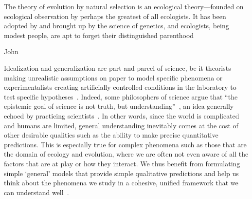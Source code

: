 \epigraph{\justifying The theory of evolution by natural selection is an ecological theory—founded on ecological observation by perhaps the greatest of all ecologists. It has been adopted by and brought up by the science of genetics, and ecologists, being modest people, are apt to forget their distinguished parenthood}{John~\citet{harper_darwinian_1967}}

%
Idealization and generalization are part and parcel of science, be it theorists making unrealistic assumptions on paper to model specific phenomena or experimentalists creating artificially controlled conditions in the laboratory to test specific hypotheses~\citep{zuk_models_2018}. Indeed, some philosophers of science argue that ``the epistemic goal of science is not truth, but understanding''~\citep{potochnik_idealization_2018}, an idea generally echoed by practicing scientists~\citep{levins_strategy_1966,servedio_not_2014,zuk_models_2018,grainger_empiricists_2022}. In other words, since the world is complicated and humans are limited, general understanding inevitably comes at the cost of other desirable qualities such as the ability to make precise quantitative predictions. This is especially true for complex phenomena such as those that are the domain of ecology and evolution, where we are often not even aware of all the factors that are at play or how they interact. We thus benefit from formulating simple `general' models that provide simple qualitative predictions and help us think about the phenomena we study in a cohesive, unified framework that we can understand well~\citep{potochnik_idealization_2018,luque_mirror_2021}.   
 
